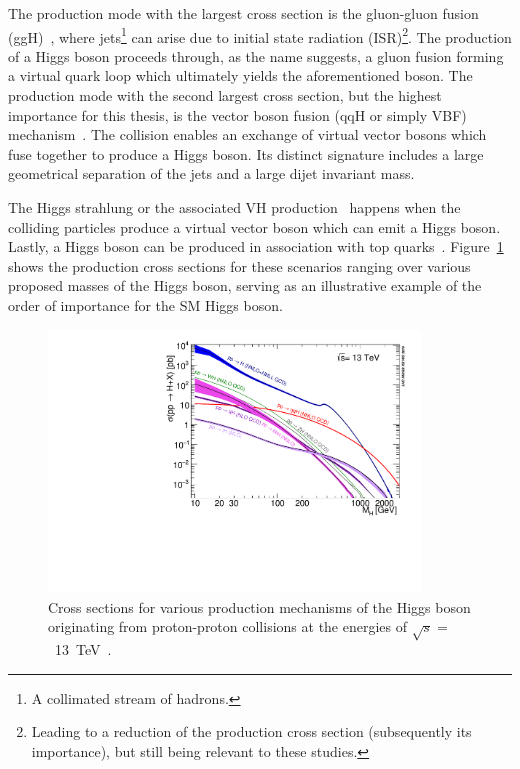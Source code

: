 \hspace{10pt} The production mode with the largest cross section is the gluon-gluon fusion (ggH)~\cite{paper:ggH1,paper:ggH2}, where jets\footnote{A collimated stream of hadrons.} can arise due to initial state radiation (ISR)\footnote{Leading to a reduction of the production cross section (subsequently its importance), but still being relevant to these studies.}. The production of a Higgs boson proceeds through, as the name suggests, a gluon fusion forming a virtual quark loop which ultimately yields the aforementioned boson. The production mode with the second largest cross section, but the highest importance for this thesis, is the vector boson fusion (qqH or simply VBF) mechanism~\cite{paper:ggH1,paper:ggH2,paper:vbf1,paper:vbf2}. The collision enables an exchange of virtual vector bosons which fuse together to produce a Higgs boson. Its distinct signature includes a large geometrical separation of the jets and a large dijet invariant mass.

\hspace{10pt} The Higgs strahlung or the associated VH production~\cite{paper:vh} happens when the colliding particles produce a virtual vector boson which can emit a Higgs boson. Lastly, a Higgs boson can be produced in association with top quarks~\cite{paper:tth1,paper:tth2}. Figure~\ref{fig:hig_production_xs} shows the production cross sections for these scenarios ranging over various proposed masses of the Higgs boson, serving as an illustrative example of the order of importance for the SM Higgs boson.

\begin{figure}[htbp]
    \begin{center}
        \includegraphics[width=0.88\textwidth]{Theory/higgs_prod_13TeV.pdf}  
        \caption{Cross sections for various production mechanisms of the Higgs boson originating from proton-proton collisions at the energies of $\sqrt{s}=$~13~TeV~\cite{twiki:lhcxswg}.}
      \label{fig:hig_production_xs}
    \end{center}
  \end{figure}

